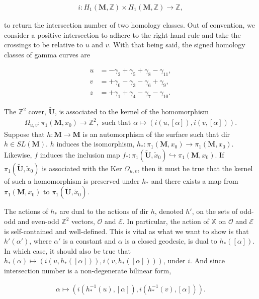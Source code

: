 \documentclass[]{article}
\begin{document}
\begin{align}
i:H_1(\mathbf{M},\mathbb Z)\times H_1(\mathbf{M},\mathbb Z)\rightarrow \mathbb Z,
\end{align}

to return the intersection number of two homology classes. Out of convention, we consider a positive intersection to adhere to the right-hand rule and take the crossings to be relative to $u$ and $v$. With that being said, the signed homology classes of gamma curves are

\begin{align*}
u &= -\gamma_2 +\gamma_5 + \gamma_8 - \gamma_{11},\\
v &= +\gamma_0 -\gamma_3 -\gamma_6 +\gamma_9,\\
z &= +\gamma_1 +\gamma_4-\gamma_7-\gamma_{10}.
\end{align*}


The $\mathbb{Z}^2$ cover, $\tilde{\mathbf{U}}$, is associated to the kernel of the homomorphism
\begin{align}
\Omega_{u,v}:\pi_1(\mathbf{M},x_0)\rightarrow \mathbb{Z}^2, \text{ such that } \alpha\mapsto(i(u,[\alpha]),i(v,[\alpha])).
\end{align}
Suppose that $h:\mathbf{M}\rightarrow\mathbf{M}$ is an automorphism of the surface such that dir $h\in SL(\mathbf M)$. $h$ induces the isomorphism, $h_*:\pi_1(\mathbf{M},x_0)\rightarrow \pi_1(\mathbf{M},x_0)$. Likewise, $f$ induces the inclusion map $f_*:\pi_1(\tilde{\mathbf{U}},\tilde x_0)\hookrightarrow\pi_1(\mathbf{M},x_0)$. If $\pi_1(\tilde{\mathbf{U}},\tilde x_0)$ is associated with the Ker $\Omega_{u,v}$, then it must be true that the kernel of such a homomorphism is preserved under $h_*$ and there exists a map from  $\pi_1(\mathbf M, x_0)$ to $\pi_1(\tilde{\mathbf{U}},\tilde x_0)$.

The actions of $h_*$ are dual to the actions of dir $h$, denoted $h'$, on the sets of odd-odd and even-odd $\mathbb{Z}^2$ vectors, $\mathcal{O}$ and $\mathcal{E}$. In particular, the action of $\mathbb X$ on $\mathcal{O}$ and $\mathcal{E}$ is self-contained and well-defined. This is vital as what we want to show is that $h'(\alpha')$, where $\alpha'$ is a constant and $\alpha$ is a closed geodesic, is dual to $h_*([\alpha])$. In which case, it should also be true that $h_*(\alpha)\mapsto(i(u,h_*([\alpha])),i(v,h_*([\alpha])))$, under $i$. And since intersection number is a non-degenerate bilinear form, 

\begin{align*}
\alpha\mapsto(i(h_*^{-1}(u),[\alpha]),i(h_*^{-1}(v),[\alpha])).
\end{align*}
\end{document}
